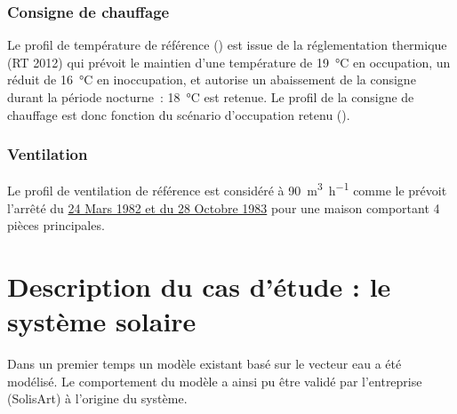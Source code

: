 

\subsubsection{Consigne de chauffage} %
\label{ssub:consigne_de_chauffage}
Le profil de température de référence () est issue de la réglementation thermique (RT
2012) qui prévoit le maintien d’une température de \SI{19}{\celsius} en occupation, un
réduit de \SI{16}{\celsius} en inoccupation, et autorise un abaissement de la consigne durant la
période nocturne~: \SI{18}{\celsius} est retenue. Le profil de la consigne de chauffage
est donc fonction du scénario d’occupation retenu ().

\subsubsection{Ventilation} %
\label{ssub:ventilation_ref}
Le profil de ventilation de référence est considéré à \SI[per-mode=symbol]{90}{\meter\cubed\per\hour}
comme le prévoit l’arrêté du \href{https://www.legifrance.gouv.fr/affichTexte.do?cidTexte=JORFTEXT000000862344}{24 Mars
1982 et du 28 Octobre 1983} pour une maison comportant 4 pièces principales.



\section{Description du cas d’étude : le système solaire} %
\label{sec:description_du_cas_d_etude_le_systeme_solaire}
Dans un premier temps un modèle existant basé sur le vecteur eau a été modélisé.
Le comportement du modèle a ainsi pu être validé par l’entreprise (SolisArt) à
l’origine du système.

